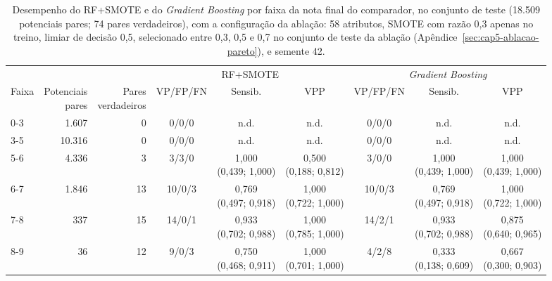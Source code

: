 \begin{table}[htbp]
\centering
\caption{Desempenho do RF+SMOTE e do \textit{Gradient Boosting} por faixa da nota final do comparador, no conjunto de teste (18.509 potenciais pares; 74 pares verdadeiros), com a configuração da ablação: 58 atributos, SMOTE com razão 0,3 apenas no treino, limiar de decisão 0,5, selecionado entre 0,3, 0,5 e 0,7 no conjunto de teste da ablação (Apêndice~\ref{sec:cap5-ablacao-pareto}), e semente 42.}
\label{tab:desempenho-faixas}
\scriptsize
\setlength{\tabcolsep}{3pt}
\begin{tabular}{@{}lrrcccccc@{}}
\toprule
& & & \multicolumn{3}{c}{RF+SMOTE} & \multicolumn{3}{c}{\textit{Gradient Boosting}} \\
\cmidrule(lr){4-6} \cmidrule(l){7-9}
Faixa & \shortstack{Potenciais\\pares} & \shortstack{Pares\\verdadeiros} & VP/FP/FN & Sensib. & VPP & VP/FP/FN & Sensib. & VPP \\
\midrule
0-3 & 1.607 & 0 & 0/0/0 & n.d. & n.d. & 0/0/0 & n.d. & n.d. \\
3-5 & 10.316 & 0 & 0/0/0 & n.d. & n.d. & 0/0/0 & n.d. & n.d. \\
5-6 & 4.336 & 3 & 3/3/0 & \shortstack{1,000\\(0,439; 1,000)} & \shortstack{0,500\\(0,188; 0,812)} & 3/0/0 & \shortstack{1,000\\(0,439; 1,000)} & \shortstack{1,000\\(0,439; 1,000)} \\
6-7 & 1.846 & 13 & 10/0/3 & \shortstack{0,769\\(0,497; 0,918)} & \shortstack{1,000\\(0,722; 1,000)} & 10/0/3 & \shortstack{0,769\\(0,497; 0,918)} & \shortstack{1,000\\(0,722; 1,000)} \\
7-8 & 337 & 15 & 14/0/1 & \shortstack{0,933\\(0,702; 0,988)} & \shortstack{1,000\\(0,785; 1,000)} & 14/2/1 & \shortstack{0,933\\(0,702; 0,988)} & \shortstack{0,875\\(0,640; 0,965)} \\
8-9 & 36 & 12 & 9/0/3 & \shortstack{0,750\\(0,468; 0,911)} & \shortstack{1,000\\(0,701; 1,000)} & 4/2/8 & \shortstack{0,333\\(0,138; 0,609)} & \shortstack{0,667\\(0,300; 0,903)} \\

\end{tabular}
\end{table}
